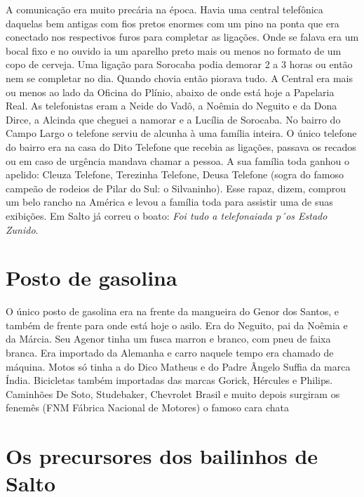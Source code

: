 \documentclass[12pt,brazil,]{book}
\begin{document}
A comunicação era muito precária na época. Havia uma central telefônica
daquelas bem antigas com fios pretos enormes com um pino na ponta que
era conectado nos respectivos furos para completar as ligações. Onde se
falava era um bocal fixo e no ouvido ia um aparelho preto mais ou menos
no formato de um copo de cerveja. Uma ligação para Sorocaba podia
demorar 2 a 3 horas ou então nem se completar no dia. Quando chovia
então piorava tudo. A Central era mais ou menos ao lado da Oficina do
Plínio, abaixo de onde está hoje a Papelaria Real. As telefonistas eram
a Neide do Vadô, a Noêmia do Neguito e da Dona Dirce, a Alcinda que
cheguei a namorar e a Lucília de Sorocaba. No bairro do Campo Largo o
telefone serviu de alcunha à uma família inteira. O único telefone do
bairro era na casa do Dito Telefone que recebia as ligações, passava os
recados ou em caso de urgência mandava chamar a pessoa. A sua família
toda ganhou o apelido: Cleuza Telefone, Terezinha Telefone, Deusa
Telefone (sogra do famoso campeão de rodeios de Pilar do Sul: o
Silvaninho). Esse rapaz, dizem, comprou um belo rancho na América e
levou a família toda para assistir uma de suas exibições. Em Salto já
correu o boato: \emph{Foi tudo a telefonaiada p´os Estado Zunido}.

\section{Posto de gasolina}\label{posto-de-gasolina}

O único posto de gasolina era na frente da mangueira do Genor dos
Santos, e também de frente para onde está hoje o asilo. Era do Neguito,
pai da Noêmia e da Márcia. Seu Agenor tinha um fusca marron e branco,
com pneu de faixa branca. Era importado da Alemanha e carro naquele
tempo era chamado de máquina. Motos só tinha a do Dico Matheus e do
Padre Ângelo Suffia da marca Índia. Bicicletas também importadas das
marcas Gorick, Hércules e Philips. Caminhões De Soto, Studebaker,
Chevrolet Brasil e muito depois surgiram os fenemês (FNM Fábrica
Nacional de Motores) o famoso cara chata

\section{Os precursores dos bailinhos de
Salto}\label{os-precursores-dos-bailinhos-de-salto}
\end{document}
